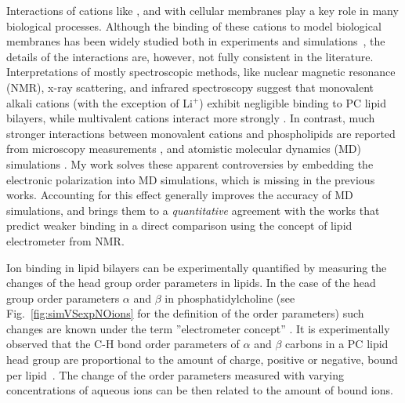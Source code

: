 \documentclass[12pt,a4paper,twoside,openright]{report}
\begin{document}
Interactions of cations like ,  and  with cellular membranes 
play a key role in many biological processes. 
Although the binding of these cations to model biological membranes 
has been widely studied both in
experiments and simulations~\citep{catte16, nmrlipids_proj4},
the details of the interactions are, however, not fully consistent in the literature.
Interpretations of mostly spectroscopic methods, like nuclear magnetic resonance (NMR), 
x-ray scattering, and infrared spectroscopy suggest that monovalent alkali cations (with the exception of Li$^+$) 
exhibit negligible binding to PC lipid bilayers, 
while multivalent cations interact more strongly 
\citep{cevc90,tocanne90, hauser76,hauser78,herbette84,altenbach84,uhrikova08}.
In contrast, much stronger interactions between monovalent cations and phospholipids are reported from 
microscopy measurements \citep{harb13,manyes06,fukuma07,ferber11,morata12},
and atomistic molecular dynamics (MD) simulations \citep{cordomi09,valley11,berkowitz12,catte16,nmrlipids_proj4,melcr18}.
My work solves these apparent controversies 
by embedding the electronic polarization into MD simulations,
which is missing in the previous works. 
Accounting for this effect generally improves the accuracy of MD simulations,
and brings them to a \emph{quantitative} agreement 
with the works that predict weaker binding 
in a direct comparison using the concept of lipid electrometer from NMR.











Ion binding in lipid bilayers can be experimentally quantified
by measuring the changes of the head group order parameters in lipids.
In the case of the head group order parameters $\alpha$ and $\beta$ in phosphatidylcholine
(see Fig.~\ref{fig:simVSexpNOions} for the definition of the order parameters)
such changes are known under the term ''electrometer concept'' \citep{seelig87,catte16, ollila16}. 
It is experimentally observed that the C-H bond
order parameters of $\alpha$ and $\beta$ carbons in a PC lipid head group
are proportional to the amount of charge, positive or negative, bound per lipid~\citep{seelig87}.
The change of the order parameters measured with varying concentrations of aqueous ions 
can be then related to the amount of bound ions.
\end{document}
